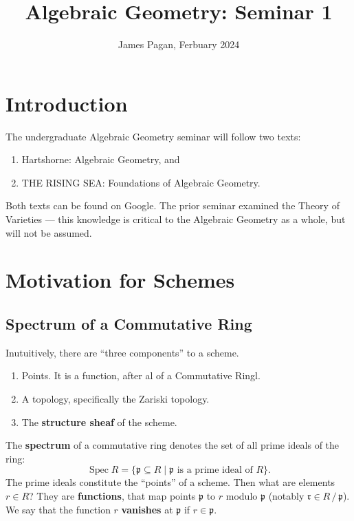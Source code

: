 \documentclass[11pt]{article}
\title{Algebraic Geometry: Seminar 1}
\author{James Pagan, Ferbuary 2024}
\newcommand{\Spec}{\operatorname{Spec}}
\begin{document}
\maketitle
\tableofcontents
\newpage


\section{Introduction}

The undergraduate Algebraic Geometry seminar will follow two texts:
\begin{enumerate}
  \item Hartshorne: Algebraic Geometry, and 
  \item THE RISING SEA: Foundations of Algebraic Geometry.
\end{enumerate}
Both texts can be found on Google. The prior seminar examined the Theory of Varieties --- this knowledge is critical to the Algebraic Geometry as a whole, but will not be assumed.



\section{Motivation for Schemes}


\subsection{Spectrum of a Commutative Ring}

Inutuitively, there are ``three components'' to a scheme.
\begin{enumerate}
  \item Points. It is a function, after al of a Commutative Ringl.
  \item A topology, specifically the Zariski topology.
  \item The \textbf{structure sheaf} of the scheme.
\end{enumerate}
The \textbf{spectrum} of a commutative ring denotes the set of all prime ideals of the ring:
\[
  \Spec R = \{ \mathfrak{p} \subseteq R \mid \text{$\mathfrak{p}$ is a prime ideal of $R$} \}.
\]
The prime ideals constitute the ``points'' of a scheme. Then what are elements $r \in R$? They are \textbf{functions}, that map points $\mathfrak{p}$ to $r$ modulo $\mathfrak{p}$ (notably $\mathfrak{r} \in R \,/\, \mathfrak{p}$). We say that the function $r$ \textbf{vanishes} at $\mathfrak{p}$ if $r \in \mathfrak{p}$.
\end{document}
